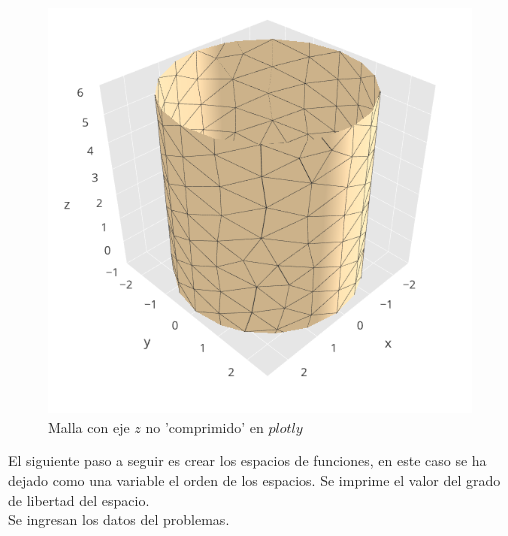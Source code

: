 \documentclass[11pt]{article}
\begin{document}
\begin{figure}[H]
\centering
\includegraphics[scale=0.8]{Imagenes/graficas/Situacion 1/Malla/malla 2.png} 
\caption{Malla con eje $z$ no 'comprimido' en $plotly$}
\end{figure}
El siguiente paso a seguir es crear los espacios de funciones, en este caso se ha dejado como una variable el orden de los espacios. Se imprime el valor del grado de libertad del espacio. \\
Se ingresan los datos del problemas.
\end{document}
